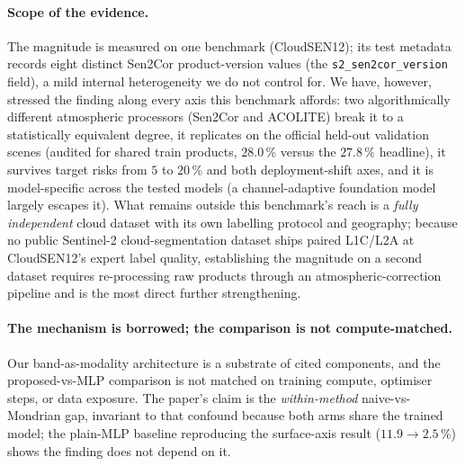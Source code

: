 \documentclass[preprint,3p,times]{elsarticle}
\begin{document}
\paragraph{Scope of the evidence.} The magnitude is measured on one benchmark (CloudSEN12); its test metadata records eight distinct Sen2Cor product-version values (the \texttt{s2\_sen2cor\_version} field), a mild internal heterogeneity we do not control for. We have, however, stressed the finding along every axis this benchmark affords: two algorithmically different atmospheric processors (Sen2Cor and ACOLITE) break it to a statistically equivalent degree, it replicates on the official held-out validation scenes (audited for shared train products, $28.0\,\%$ versus the $27.8\,\%$ headline), it survives target risks from $5$ to $20\,\%$ and both deployment-shift axes, and it is model-specific across the tested models (a channel-adaptive foundation model largely escapes it). What remains outside this benchmark's reach is a \emph{fully independent} cloud dataset with its own labelling protocol and geography; because no public Sentinel-2 cloud-segmentation dataset ships paired L1C/L2A at CloudSEN12's expert label quality, establishing the magnitude on a second dataset requires re-processing raw products through an atmospheric-correction pipeline and is the most direct further strengthening.

\paragraph{The mechanism is borrowed; the comparison is not compute-matched.} Our band-as-modality architecture is a substrate of cited components, and the proposed-vs-MLP comparison is not matched on training compute, optimiser steps, or data exposure. The paper's claim is the \emph{within-method} naive-vs-Mondrian gap, invariant to that confound because both arms share the trained model; the plain-MLP baseline reproducing the surface-axis result ($11.9 \to 2.5\,\%$) shows the finding does not depend on it.
\end{document}
